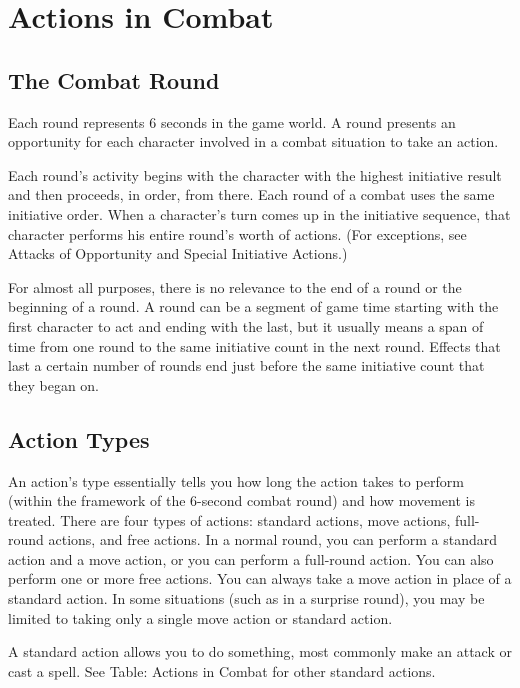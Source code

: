 \section{Actions in Combat}

\subsection{The Combat Round}

Each round represents 6 seconds in the game world. A round presents an opportunity for each character involved in a combat situation to take an action. 

Each round's activity begins with the character with the highest initiative result and then proceeds, in order, from there. Each round of a combat uses the same initiative order. When a character's turn comes up in the initiative sequence, that character performs his entire round's worth of actions. (For exceptions, see Attacks of Opportunity and Special Initiative Actions.)

For almost all purposes, there is no relevance to the end of a round or the beginning of a round. A round can be a segment of game time starting with the first character to act and ending with the last, but it usually means a span of time from one round to the same initiative count in the next round. Effects that last a certain number of rounds end just before the same initiative count that they began on.

\subsection{Action Types}

An action's type essentially tells you how long the action takes to perform (within the framework of the 6-second combat round) and how movement is treated. There are four types of actions: standard actions, move actions, full-round actions, and free actions.
In a normal round, you can perform a standard action and a move action, or you can perform a full-round action. You can also perform one or more free actions. You can always take a move action in place of a standard action. In some situations (such as in a surprise round), you may be limited to taking only a single move action or standard action.

\vspace*{10pt}

A standard action allows you to do something, most commonly make an attack or cast a spell. See Table: Actions in Combat for other standard actions.

